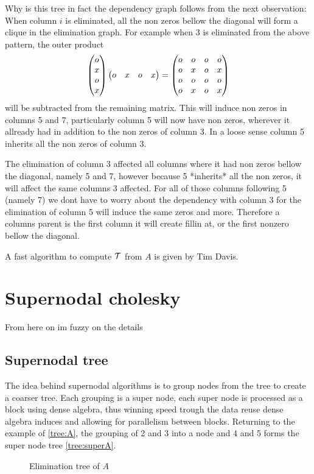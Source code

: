\documentclass{article}
\begin{document}
Why is this tree in fact the dependency graph follows from the next observation:
When column $i$ is eliminated, all the non zeros bellow the diagonal will form
a clique in the elimination graph.
For example when 3 is eliminated from the
above pattern, the outer product  \[\begin{pmatrix}o \\ x\\ o \\ x\end{pmatrix} \begin{pmatrix}o & x & o & x\end{pmatrix} = \begin{pmatrix} o &
o & o & o\\ o & x&o&x\\o &o&o&o\\o&x&o&x\end{pmatrix}\] will be subtracted from the remaining matrix. This
will induce non zeros in columns 5 and 7, particularly column 5 will now have
non zeros, wherever it allready had in addition to the non zeros of column 3.
In a loose sense column 5 inherits all the non zeros of column 3.

The elimination of column 3 affected all columns where it had non zeros bellow the diagonal, namely 
5 and 7, however because 5 *inherits* all the non zeros, it will affect the same columns 3 affected. 
For all of those columns following 5 (namely 7) we dont have to worry about the dependency with column 
3 for the elimination of column 5 will induce the same zeros and more. Therefore a columns parent 
is the first column it will create fillin at, or the first nonzero bellow the diagonal.

A fast algorithm to compute $\mathcal{T}$ from $A$ is given by Tim Davis.

\section{Supernodal cholesky}
From here on im fuzzy on the details

\subsection{Supernodal tree}
The idea behind supernodal algorithms is to group nodes from the tree to create a coarser 
tree. Each grouping is a super node, each super node is processed as a block using dense 
algebra, thus winning speed trough the data reuse dense algebra induces and allowing for 
parallelism between blocks. 
Returning to the example of \eqref{tree:A}, the grouping of 2 and 3 into a node and 4 and 5
forms the super node tree \eqref{tree:superA}.
\begin{figure}[H]
\centering
\caption{Elimination tree of $A$}
\label{tree:superA}
\end{figure}
\end{document}

